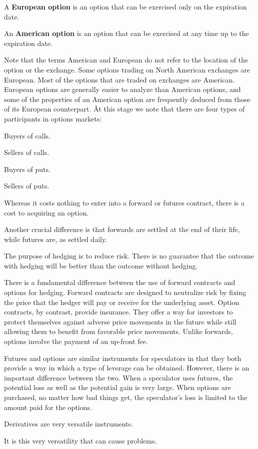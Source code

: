 A \textbf{European option} is an option that can be exercised only on the expiration date.
\ed

An \textbf{American option} is an option that can be exercised at any time up to the expiration date.
\ed

Note that the terms American and European do not refer to the location of the option or the exchange. Some options
trading on North American exchanges are European. Most of the options that are traded on exchanges are American.
European options are generally easier to analyze than American options, and some of the properties of an American
option are frequently deduced from those of its European counterpart. \v

At this stage we note that there are four types of participants in options markets:
\bit
\item Buyers of calls.
\item Sellers of calls.
\item Buyers of puts.
\item Sellers of puts.
\eit

Whereas it costs nothing to enter into a forward or futures contract, there is a cost to acquiring an option.





Another crucial
difference is that forwards are settled at the end of their life, while futures are, as settled daily.


The purpose of hedging is to reduce risk. There is no guarantee that the outcome with hedging will be better than the
outcome without hedging.

There is a fundamental difference between the use of forward contracts and options
for hedging. Forward contracts are designed to neutralize risk by fixing the price that
the hedger will pay or receive for the underlying asset. Option contracts, by contrast,
provide insurance. They offer a way for investors to protect themselves against adverse
price movements in the future while still allowing them to benefit from favorable price
movements. Unlike forwards, options involve the payment of an up-front fee.

Futures and options are similar instruments for speculators in that they both provide a
way in which a type of leverage can be obtained. However, there is an important
difference between the two. When a speculator uses futures, the potential loss as well as
the potential gain is very large. When options are purchased, no matter how bad things
get, the speculator's loss is limited to the amount paid for the options.


Derivatives are very versatile instruments.



It is this very versatility that can cause problems.